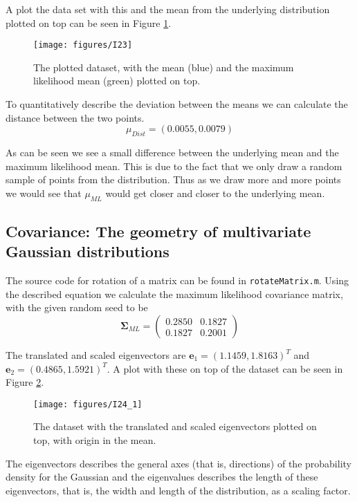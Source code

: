 \documentclass[a4paper, 11pt]{article}
\newcommand{\vect}[1]{\mathbf{#1}}
\begin{document}
A plot the data set with this and the mean from the underlying distribution plotted on top can be seen in Figure \ref{fig:I23}.
\begin{figure}[H]
    \centering
    \texttt{[image: figures/I23]}
    \caption{The plotted dataset, with the mean (blue) and the maximum likelihood mean (green) plotted on top.}
    \label{fig:I23}
\end{figure}

To quantitatively describe the deviation between the means we can calculate the distance between the two points.
\[
    \mu_{Dist} = (0.0055, 0.0079)
\]

As can be seen we see a small difference between the underlying mean and the maximum likelihood mean. This is due to the fact that we only draw a random sample of points from the distribution. Thus as we draw more and more points we would see that $\mu_{ML}$ would get closer and closer to the underlying mean.

\subsection{Covariance: The geometry of multivariate Gaussian distributions}
\label{sub:covariance__the_geometry_of_multivariate_Gaussian_distributions}

The source code for rotation of a matrix can be found in \texttt{rotateMatrix.m}. Using the described equation we calculate the maximum likelihood covariance matrix, with the given random seed to be
\[
    \boldsymbol \Sigma_{ML} = \begin{pmatrix}
    0.2850 & 0.1827 \\
    0.1827 & 0.2001
    \end{pmatrix}
\]

The translated and scaled eigenvectors are $\vect e_1 = ( 1.1459, 1.8163 )^T$ and $\vect e_2 = (0.4865, 1.5921)^T$. A plot with these on top of the dataset can be seen in Figure \ref{fig:I24_1}.

\begin{figure}[H]
    \centering
    \texttt{[image: figures/I24\_1]}
    \caption{The dataset with the translated and scaled eigenvectors plotted on top, with origin in the mean.}
    \label{fig:I24_1}
\end{figure}

The eigenvectors describes the general axes (that is, directions) of the probability density for the Gaussian and the eigenvalues describes the length of these eigenvectors, that is, the width and length of the distribution, as a scaling factor.
\end{document}
